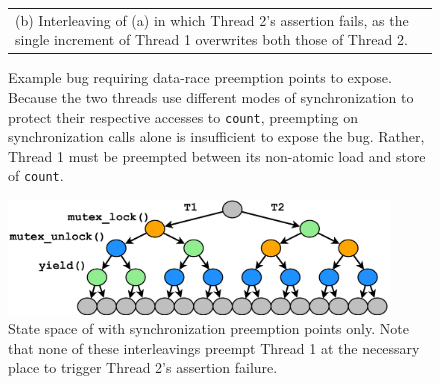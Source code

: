 {\begin{figure}[t]
\begin{center}
\begin{tabular}{p{}}
			\\
			(b) Interleaving of (a) in which Thread 2's assertion fails,
			as the single increment of Thread 1 overwrites both those of Thread 2.
		\end{tabular}
	\end{center}
	\caption[Example bug requiring data-race preemption points to expose.]
	{Example bug requiring data-race preemption points to expose.
	Because the two threads use different modes of synchronization to protect their respective accesses to {\tt count},
	preempting on synchronization calls alone is insufficient to expose the bug.
	Rather, Thread 1 must be preempted between its non-atomic load and store of {\tt count}.
	}
	\label{fig:pps-example}
\end{figure}

\begin{figure}[ht!] %
	\begin{center}
		\includegraphics[width=0.9\textwidth]{../oopsla/tree-maximal-only.pdf}
	\end{center}
	\caption[State space of  with synchronization preemption points only.]
	{State space of  with synchronization preemption points only.
	Note that none of these interleavings preempt Thread 1 at the necessary place
	to trigger Thread 2's assertion failure.}
	\label{fig:pps-statespace}
\end{figure}
}

